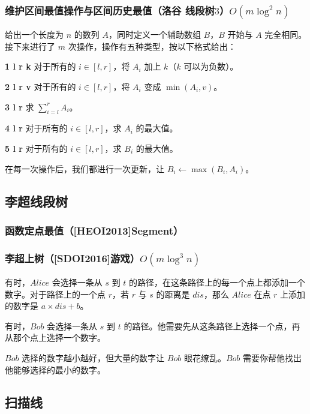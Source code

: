 \documentclass[twoside,a4paper]{article}
\begin{document}
\subsubsection{维护区间最值操作与区间历史最值（洛谷 线段树$3$）$O(m \log ^{2}n)$}
给出一个长度为 $n$ 的数列 $A$，同时定义一个辅助数组 $B$，$B$ 开始与 $A$ 完全相同。接下来进行了 $m$ 次操作，操作有五种类型，按以下格式给出：\par
\textbf{1 l r k} 对于所有的 $i\in[l,r]$，将 $A_i$ 加上 $k$（$k$ 可以为负数）。\par
\textbf{2 l r v} 对于所有的 $i\in[l,r]$，将 $A_i$ 变成 $\min(A_i,v)$。\par
\textbf{3 l r} 求 $\sum_{i=l}^{r}A_i$。\par
\textbf{4 l r} 对于所有的 $i\in[l,r]$，求 $A_i$ 的最大值。\par
\textbf{5 l r} 对于所有的 $i\in[l,r]$，求 $B_i$ 的最大值。\par
在每一次操作后，我们都进行一次更新，让 $B_i\gets\max(B_i,A_i)$。\par


\subsection{李超线段树}
\subsubsection{函数定点最值（[HEOI2013]Segment）}


\subsubsection{李超上树（[SDOI2016]游戏）$O(m \log ^{3}n)$}
有时，$Alice$ 会选择一条从 $s$ 到 $t$ 的路径，在这条路径上的每一个点上都添加一个数字。对于路径上的一个点 $r$，若 $r$ 与 $s$ 的距离是 $dis$，那么 $Alice$ 在点 $r$ 上添加的数字是 $a\times dis + b$。\par
有时，$Bob$ 会选择一条从 $s$ 到 $t$ 的路径。他需要先从这条路径上选择一个点，再从那个点上选择一个数字。\par
$Bob$ 选择的数字越小越好，但大量的数字让 $Bob$ 眼花缭乱。$Bob$ 需要你帮他找出他能够选择的最小的数字。


\subsection{扫描线}
\end{document}
